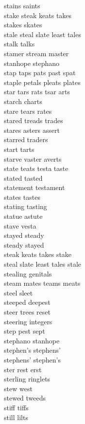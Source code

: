 stains saints\\
stake steak keats takes\\
stakes skates\\
stale steal slate least tales\\
stalk talks\\
stamer stream master\\
stanhope stephano\\
stap taps pats past spat\\
staple petals pleats plates\\
star tars rats tsar arts\\
starch charts\\
stare tears rates\\
stared treads trades\\
stares asters assert\\
starred traders\\
start tarts\\
starve vaster averts\\
state teats testa taste\\
stated tasted\\
statement testament\\
states tastes\\
stating tasting\\
statue astute\\
stave vesta\\
stayed steady\\
steady stayed\\
steak keats takes stake\\
steal slate least tales stale\\
stealing genitals\\
steam mates teams meats\\
steel sleet\\
steeped deepest\\
steer trees reset\\
steering integers\\
step pest sept\\
stephano stanhope\\
stephen's stephens'\\
stephens' stephen's\\
ster rest erst\\
sterling ringlets\\
stew west\\
stewed tweeds\\
stiff tiffs\\
still lilts\\

